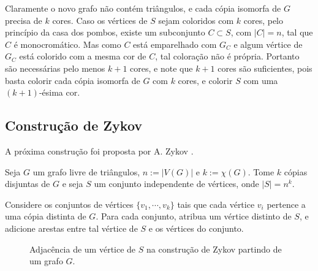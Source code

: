 Claramente o novo grafo não contém triângulos, e cada cópia isomorfa de $G$ precisa de $k$ cores. Caso os vértices de $S$ sejam coloridos com $k$ cores, pelo princípio da casa dos pombos, existe um subconjunto $C \subset S$, com $|C| = n$, tal que $C$ é monocromático. Mas como $C$ está emparelhado com $G_C$ e algum vértice de $G_C$ está colorido com a mesma cor de $C$, tal coloração não é própria. Portanto são necessárias pelo menos $k+1$ cores, e note que $k+1$ cores são suficientes, pois basta colorir cada cópia isomorfa de $G$ com $k$ cores, e colorir $S$ com uma $(k+1)$-ésima cor.

\subsection{Construção de Zykov}

A próxima construção foi proposta por A. Zykov \cite{zykov1949some}.

Seja $G$ um grafo livre de triângulos, $n:=|V(G)|$ e $k:= \chi(G)$. Tome $k$ cópias disjuntas de $G$ e seja $S$ um conjunto independente de vértices, onde $|S| = n^k$.

Considere os conjuntos de vértices $\{v_1,\cdots,v_k\}$ tais que cada vértice $v_i$ pertence a uma cópia distinta de $G$. Para cada conjunto, atribua um vértice distinto de $S$, e adicione arestas entre tal vértice de $S$ e os vértices do conjunto.

\begin{figure}[H]
\centering
{}
\caption{Adjacência de um vértice de $S$ na construção de Zykov partindo de um grafo $G$.}
\label{fig:zykovexample}
\end{figure}

